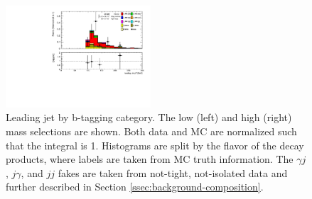 \begin{figure}[p]
  \includegraphics[width=0.48\textwidth]{chapters/chapter5_yybb/images/data_MC_comparison/h_SR_h_2t_nominal_leadingJet_pt.pdf}
  \caption[Leading jet \pt by \btagging category]{Leading jet \pt by b-tagging category. The low (left) and high (right) mass selections are shown. Both data and MC are normalized such that the integral is 1. Histograms are split by the flavor of the \Hbb decay products, where labels are taken from \gls{MC} truth information. The $\gamma j$, $j\gamma$, and $jj$ fakes are taken from not-tight, not-isolated data and further described in Section \ref{ssec:background-composition}.
  \label{fig:jet_l_pt}}
\end{figure}

